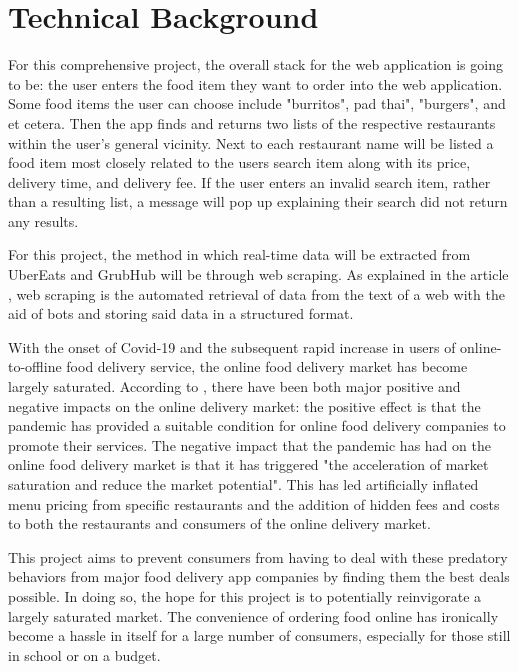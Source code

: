 \documentclass[10pt,twocolumn]{article}
\begin{document}
\section{Technical Background}

For this comprehensive project, the overall stack for the web application is going to be: the user enters the food item they want to order into the web application. Some food items the user can choose include "burritos", pad thai", "burgers", and et cetera. Then the app finds and returns two lists of the respective restaurants within the user's general vicinity. Next to each restaurant name will be listed a food item most closely related to the users search item along with its price, delivery time, and delivery fee. If the user enters an invalid search item, rather than a resulting list, a message will pop up explaining their search did not return any results.

For this project, the method in which real-time data will be extracted from UberEats and GrubHub will be through web scraping. As explained in the article , web scraping is the automated retrieval of data from the text of a web with the aid of bots and storing said data in a structured format. 

With the onset of Covid-19 and the subsequent rapid increase in users of online-to-offline food delivery service, the online food delivery market has become largely saturated. According to , there have been both major positive and negative impacts on the online delivery market: the positive effect is that the pandemic has provided a suitable condition for online food delivery companies to promote their services. The negative impact that the pandemic has had on the online food delivery market is that it has triggered "the acceleration of market saturation and reduce the market potential". This has led artificially inflated menu pricing from specific restaurants and the addition of hidden fees and costs to both the restaurants and consumers of the online delivery market.

This project aims to prevent consumers from having to deal with these predatory behaviors from major food delivery app companies by finding them the best deals possible. In doing so, the hope for this project is to potentially reinvigorate a largely saturated market. The convenience of ordering food online has ironically become a hassle in itself for a large number of consumers, especially for those still in school or on a budget. 
\end{document}
